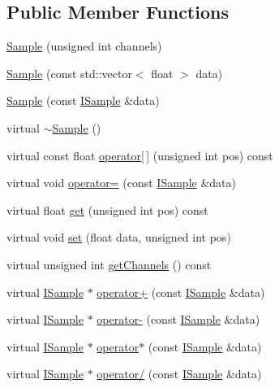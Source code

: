 \subsection*{Public Member Functions}
\begin{DoxyCompactItemize}
\item 
\hyperlink{classmaudio_1_1Sample_a4a18ac0617d8af885f173fac6a64d99e}{Sample} (unsigned int channels)
\item 
\hyperlink{classmaudio_1_1Sample_a46a4149c6c4facdb2c961896dee3d9b9}{Sample} (const std\-::vector$<$ float $>$ data)
\item 
\hyperlink{classmaudio_1_1Sample_a380515efa355237efefe53a4b4ab80b5}{Sample} (const \hyperlink{classmaudio_1_1ISample}{I\-Sample} \&data)
\item 
virtual \hyperlink{classmaudio_1_1Sample_a51b823c9794d373f72d9471edaf5f9c3}{$\sim$\-Sample} ()
\item 
virtual const float \hyperlink{classmaudio_1_1Sample_afb3132c845a9254cab792c704f163e10}{operator\mbox{[}$\,$\mbox{]}} (unsigned int pos) const 
\item 
virtual void \hyperlink{classmaudio_1_1Sample_af3e4beb689ca243a5f1da0b32c1e8931}{operator=} (const \hyperlink{classmaudio_1_1ISample}{I\-Sample} \&data)
\item 
virtual float \hyperlink{classmaudio_1_1Sample_abc1d709a5c730747aa155109a11d99ce}{get} (unsigned int pos) const 
\item 
virtual void \hyperlink{classmaudio_1_1Sample_a3e934051125c16e499d04bdb974e9f44}{set} (float data, unsigned int pos)
\item 
virtual unsigned int \hyperlink{classmaudio_1_1Sample_a30b228a9490d8afa6dfdcf34d44553c3}{get\-Channels} () const 
\item 
virtual \hyperlink{classmaudio_1_1ISample}{I\-Sample} $\ast$ \hyperlink{classmaudio_1_1Sample_a3784ec5b915e1a06f76af431cf2d51e3}{operator+} (const \hyperlink{classmaudio_1_1ISample}{I\-Sample} \&data)
\item 
virtual \hyperlink{classmaudio_1_1ISample}{I\-Sample} $\ast$ \hyperlink{classmaudio_1_1Sample_af6fab639be30873ff867c95be407ea6e}{operator-\/} (const \hyperlink{classmaudio_1_1ISample}{I\-Sample} \&data)
\item 
virtual \hyperlink{classmaudio_1_1ISample}{I\-Sample} $\ast$ \hyperlink{classmaudio_1_1Sample_a1b7626f92fc63060bbbe718a57a801d8}{operator$\ast$} (const \hyperlink{classmaudio_1_1ISample}{I\-Sample} \&data)
\item 
virtual \hyperlink{classmaudio_1_1ISample}{I\-Sample} $\ast$ \hyperlink{classmaudio_1_1Sample_aa0fc9649f0c195a614a57e5be2092b5c}{operator/} (const \hyperlink{classmaudio_1_1ISample}{I\-Sample} \&data)

\end{DoxyCompactItemize}
